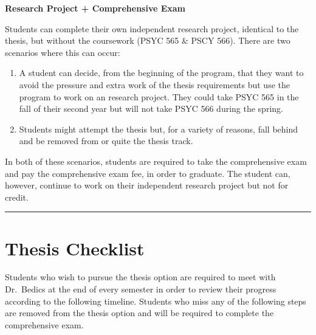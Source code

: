 \documentclass[openany]{book}
\providecommand{\tightlist}{%
  \setlength{\itemsep}{0pt}\setlength{\parskip}{0pt}}
\begin{document}
\textbf{Research Project + Comprehensive Exam}

Students can complete their own independent research project, identical to the thesis, but without the coursework (PSYC 565 \& PSCY 566). There are two scenarios where this can occur:

\begin{enumerate}
\def\labelenumi{\arabic{enumi}.}
\tightlist
\item
  A student can decide, from the beginning of the program, that they want to avoid the pressure and extra work of the thesis requirements but use the program to work on an research project. They could take PSYC 565 in the fall of their second year but will not take PSYC 566 during the spring.
\item
  Students might attempt the thesis but, for a variety of reasons, fall behind and be removed from or quite the thesis track.
\end{enumerate}

In both of these scenarios, students are required to take the comprehensive exam and pay the comprehensive exam fee, in order to graduate. The student can, however, continue to work on their independent research project but not for credit.

\begin{center}\rule{0.5\linewidth}{0.5pt}\end{center}

\hypertarget{thesis-checklist}{%
\chapter{Thesis Checklist}\label{thesis-checklist}}

Students who wish to pursue the thesis option are required to meet with Dr.~Bedics at the end of every semester in order to review their progress according to the following timeline.
Students who miss any of the following steps are removed from the thesis option and will be required to complete the comprehensive exam.
\end{document}
